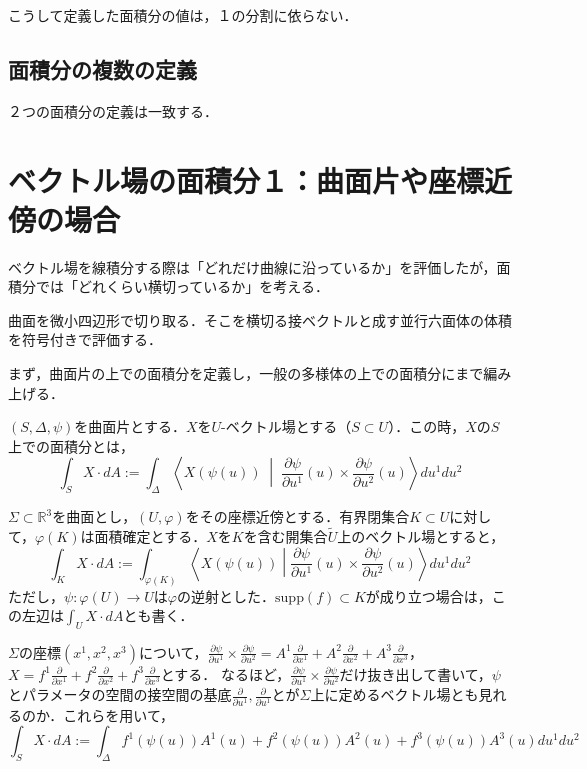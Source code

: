 \documentclass[uplatex, dvipdfmx]{jsreport}
\begin{document}
\begin{theorem}
    こうして定義した面積分の値は，１の分割に依らない．
\end{theorem}

\subsection{面積分の複数の定義}

\begin{theorem}
    ２つの面積分の定義は一致する．
\end{theorem}

\section{ベクトル場の面積分１：曲面片や座標近傍の場合}

ベクトル場を線積分する際は「どれだけ曲線に沿っているか」を評価したが，面積分では「どれくらい横切っているか」を考える．

曲面を微小四辺形で切り取る．そこを横切る接ベクトルと成す並行六面体の体積を符号付きで評価する．

まず，曲面片の上での面積分を定義し，一般の多様体の上での面積分にまで編み上げる．

\begin{definition}[曲面片上での面積分]
    $(S,\Delta,\psi)$を曲面片とする．$X$を$U$-ベクトル場とする（$S\subset U$）．この時，$X$の$S$上での面積分とは，
    \[ \int_S X\cdot dA := \int_\Delta \left\langle X(\psi(u))\;\middle|\; \frac{\partial \psi}{\partial u^1}(u)\times\frac{\partial \psi}{\partial u^2}(u) \right\rangle du^1du^2 \]
\end{definition}

\begin{definition}[座標近傍上での面積分]
    $\Sigma\subset\mathbb{R}^3$を曲面とし，$(U,\varphi)$をその座標近傍とする．有界閉集合$K\subset U$に対して，$\varphi(K)$は面積確定とする．$X$を$K$を含む開集合$\tilde{U}$上のベクトル場とすると，
    \[ \int_K X\cdot dA := \int_{\varphi(K)}\left\langle X(\psi(u))\middle| \frac{\partial \psi}{\partial u^1}(u)\times\frac{\partial \psi}{\partial u^2}(u) \right\rangle du^1du^2 \]
    ただし，$\psi:\varphi(U)\to U$は$\varphi$の逆射とした．$\mathrm{supp}(f)\subset K$が成り立つ場合は，この左辺は$\int_UX\cdot dA$とも書く．
\end{definition}

\begin{remark}[計算式]
    $\Sigma$の座標$(x^1,x^2,x^3)$について，$\frac{\partial \psi}{\partial u^1}\times\frac{\partial \psi}{\partial u^2}=A^1\frac{\partial}{\partial x^1}+A^2\frac{\partial}{\partial x^2}+A^3\frac{\partial}{\partial x^3}$，$X=f^1\frac{\partial}{\partial x^1}+f^2\frac{\partial}{\partial x^2}+f^3\frac{\partial}{\partial x^3}$とする．
    なるほど，$\frac{\partial \psi}{\partial u^1}\times\frac{\partial \psi}{\partial u^2}$だけ抜き出して書いて，$\psi$とパラメータの空間の接空間の基底$\frac{\partial}{\partial u^1}, \frac{\partial}{\partial u^1}$とが$\Sigma$上に定めるベクトル場とも見れるのか．これらを用いて，
    \[ \int_S X\cdot dA := \int_{\Delta}  f^1(\psi(u))A^1(u)+f^2(\psi(u))A^2(u)+f^3(\psi(u))A^3(u) du^1du^2 \]
\end{remark}
\end{document}
